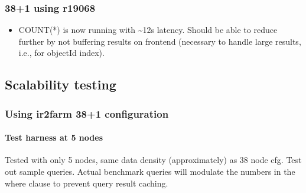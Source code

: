 \documentclass[DM,toc]{lsstdoc}
\begin{document}
\subsubsection{38+1 using r19068}\label{using-r19068}

\begin{itemize}
\item
  COUNT(*) is now running with \textasciitilde{}12s latency. Should be
  able to reduce further by not buffering results on frontend (necessary
  to handle large results, i.e., for objectId index).
\end{itemize}

\subsection{Scalability testing}\label{scalability-testing}

\subsubsection{Using ir2farm 38+1
configuration}\label{using-ir2farm-381-configuration}

\paragraph{Test harness at 5 nodes}\label{test-harness-at-5-nodes}

Tested with only 5 nodes, same data density (approximately) as 38 node
cfg. Test out sample queries. Actual benchmark queries will modulate the
numbers in the where clause to prevent query result caching.
\end{document}
